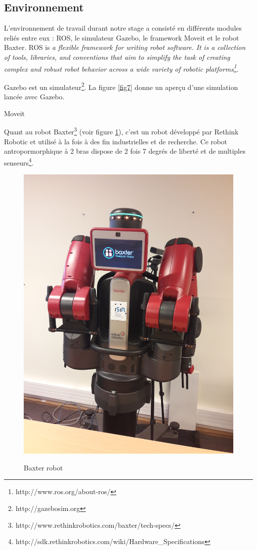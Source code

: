 \documentclass{llncs}
\begin{document}




\subsection{Environnement}

L'environnement de travail durant notre stage a consisté en différents modules reliés entre eux : ROS,  le simulateur  Gazebo, le framework Moveit et le robot Baxter. ROS is \textit{a flexible framework for writing robot software. It is a collection of tools, libraries, and conventions that aim to simplify the task of creating complex and robust robot behavior across a wide variety of robotic platforms\footnote{http://www.ros.org/about-ros/}}.

Gazebo est un simulateur\footnote{http://gazebosim.org}. La figure \ref{fig7} donne un aperçu d'une simulation lancée avec Gazebo.

Moveit

Quant au robot Baxter\footnote{http://www.rethinkrobotics.com/baxter/tech-specs/} (voir figure \ref{fig:baxter}), c'est un robot développé par Rethink Robotic et utilisé à la fois à des fin industrielles et de recherche. Ce robot antropormorphique à 2 bras dispose de 2 fois 7 degrés de liberté et de multiples senseurs\footnote{http://sdk.rethinkrobotics.com/wiki/Hardware\_Specifications}.

\begin{figure}
	\centering
	\includegraphics[angle=-90,width=.5\textwidth]{figures/baxter}
	\label{fig:baxter}
	\caption{Baxter robot}
\end{figure}
\end{document}
